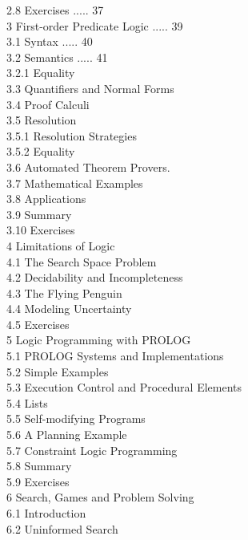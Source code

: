 \documentclass[10pt]{book}
\begin{document}
2.8 Exercises ..... 37\\
3 First-order Predicate Logic ..... 39\\
3.1 Syntax ..... 40\\
3.2 Semantics ..... 41\\
3.2.1 Equality \\
3.3 Quantifiers and Normal Forms \\
3.4 Proof Calculi \\
3.5 Resolution \\
3.5.1 Resolution Strategies \\
3.5.2 Equality \\
3.6 Automated Theorem Provers. \\
3.7 Mathematical Examples \\
3.8 Applications \\
3.9 Summary \\
3.10 Exercises \\
4 Limitations of Logic \\
4.1 The Search Space Problem \\
4.2 Decidability and Incompleteness \\
4.3 The Flying Penguin \\
4.4 Modeling Uncertainty \\
4.5 Exercises \\
5 Logic Programming with PROLOG \\
5.1 PROLOG Systems and Implementations \\
5.2 Simple Examples \\
5.3 Execution Control and Procedural Elements \\
5.4 Lists \\
5.5 Self-modifying Programs \\
5.6 A Planning Example \\
5.7 Constraint Logic Programming \\
5.8 Summary \\
5.9 Exercises \\
6 Search, Games and Problem Solving \\
6.1 Introduction \\
6.2 Uninformed Search \\
\end{document}
